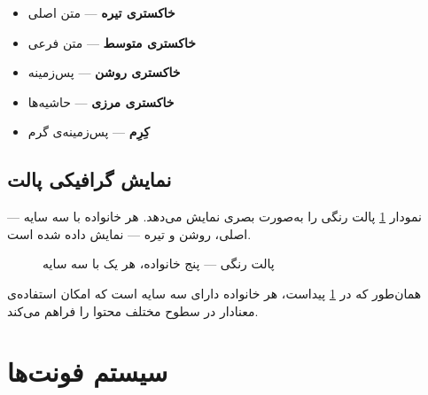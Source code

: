 \documentclass{matinbook}
\begin{document}
\begin{itemize}
    \item \textcolor{matindarkgray}{\textbf{خاکستری تیره}} — متن اصلی
    \item \textcolor{matinmediumgray}{\textbf{خاکستری متوسط}} — متن فرعی
    \item \colorbox{matinlightgray}{\textbf{خاکستری روشن}} — پس‌زمینه
    \item \colorbox{matinbordergray}{\textbf{خاکستری مرزی}} — حاشیه‌ها
    \item \colorbox{matincream}{\textbf{کِرِم}} — پس‌زمینه‌ی گرم
\end{itemize}

\section{نمایش گرافیکی پالت}
\label{sec:color-swatches}

نمودار \cref{fig:color-swatches} پالت رنگی  را به‌صورت
بصری نمایش می‌دهد. هر خانواده با سه سایه — اصلی، روشن و تیره —
نمایش داده شده است.

\begin{figure}[h]
\centering
\begin{latin}
\end{latin}
\caption{پالت رنگی  — پنج خانواده، هر یک با سه سایه}
\label{fig:color-swatches}
\end{figure}

همان‌طور که در \cref{fig:color-swatches} پیداست، هر خانواده
دارای سه سایه است که امکان استفاده‌ی معنادار در سطوح مختلف
محتوا را فراهم می‌کند.

\chapter{سیستم فونت‌ها}
\label{chap:fonts}
\end{document}

